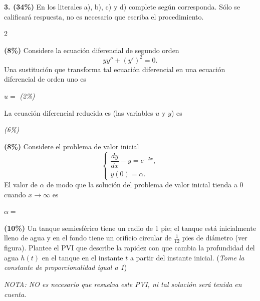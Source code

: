 \documentclass[11pt]{article}
\begin{document}
\newpage

\noindent\textbf{3. (34\%)} En los literales a), b), c) y d) complete según corresponda. Sólo se calificará respuesta, no es necesario que escriba el procedimiento.

\begin{multicols}{2}

\begin{opciones}
\item[a)] \textbf{(8\%)} Considere la ecuación diferencial de segundo orden
\[
yy''+(y')^2=0.
\]
Una sustitución que transforma tal ecuación diferencial en una ecuación diferencial de orden uno es

$u=$ \underline{\hspace{2.5cm}} \textit{(2\%)}

La ecuación diferencial reducida es (las variables $u$ y $y$) es

\underline{\hspace{4.5cm}} \textit{(6\%)}

\item[b)] \textbf{(8\%)} Considere el problema de valor inicial
\[
\begin{cases}
\dfrac{dy}{dx}-y=e^{-2x}, \\
y(0)=\alpha.
\end{cases}
\tag{1}
\]
El valor de $\alpha$ de modo que la solución del problema de valor inicial tienda a $0$ cuando $x\to\infty$ es

$\alpha=$ \underline{\hspace{2.5cm}}

\item[c)] \textbf{(10\%)} Un tanque semiesférico tiene un radio de 1 pie; el tanque está inicialmente lleno de agua y en el fondo tiene un orificio circular de $\frac{1}{12}$ pies de diámetro (ver figura). Plantee el PVI que describe la rapidez con que cambia la profundidad del agua $h(t)$ en el tanque en el instante $t$ a partir del instante inicial. (\textit{Tome la constante de proporcionalidad igual a 1})

\textit{NOTA: NO es necesario que resuelva este PVI, ni tal solución será tenida en cuenta.}

\begin{center}
\end{center}


\end{opciones}
\end{multicols}
\end{document}
